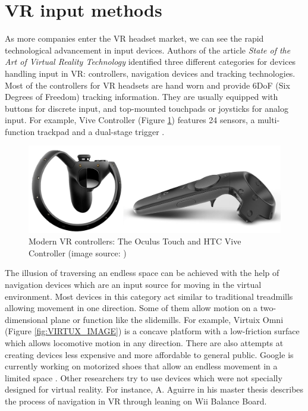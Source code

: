 \section{VR input methods}

As more companies enter the VR headset market, we can see the rapid technological advancement in input devices. Authors of the article \textit{State of the Art of Virtual Reality Technology} \cite{VR_TECHNOLOGY} identified three different categories for devices handling input in VR: controllers, navigation devices and tracking technologies. Most of the controllers for VR headsets are hand worn and provide 6DoF (Six Degrees of Freedom) tracking information. They are usually equipped with buttons for discrete input, and top-mounted touchpads or joysticks for analog input. For example, Vive Controller (Figure \ref{fig:CONTROLLERS_IMAGE}) features 24 sensors, a multi-function trackpad and a dual-stage trigger \cite{VIVE_IMAGE}.

\begin{figure}[th]
\centering
\includegraphics[width=1\textwidth]{img/modern_controllers.png}
\caption{Modern VR controllers: The Oculus Touch and HTC Vive Controller (image source: \cite{VR_TECHNOLOGY}\cite{VIVE_IMAGE})}
\label{fig:CONTROLLERS_IMAGE}
\end{figure}

The illusion of traversing an endless space can be achieved with the help of navigation devices which are an input source for moving in the virtual environment. Most devices in this category act similar to traditional treadmills allowing movement in one direction. Some of them allow motion on a two-dimensional plane or function like the slidemills. For example, Virtuix Omni (Figure \ref{fig:VIRTUX_IMAGE}) is a concave platform with a low-friction surface which allows locomotive motion in any direction. There are also attempts at creating devices less expensive and more affordable to general public. Google is currently working on motorized shoes that allow an endless movement in a limited space \cite{VR_SHOES}. Other researchers try to use devices which were not specially designed for virtual reality. For instance, A. Aguirre in his master thesis \cite{JOYSTICK} describes the process of navigation in VR through leaning on Wii Balance Board.

